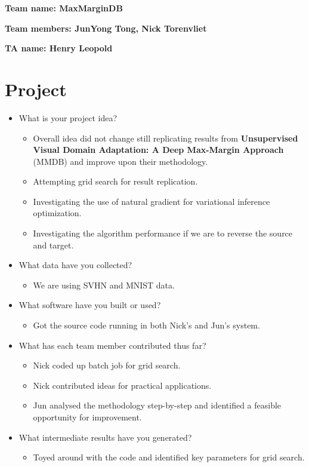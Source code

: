\textbf{Team name: MaxMarginDB}

\textbf{Team members: JunYong Tong, Nick Torenvliet}

\textbf{TA name: Henry Leopold}

\section*{Project}
\begin{itemize}
  \item What is your project idea?
  \begin{itemize}
      \item Overall idea did not change still replicating results from \textbf{Unsupervised Visual Domain Adaptation: A Deep Max-Margin Approach} (MMDB) and improve upon their methodology.
      \item Attempting grid search for result replication.
      \item Investigating the use of natural gradient for variational inference optimization.
      \item Investigating the algorithm performance if we are to reverse the source and target.
  \end{itemize}
  \item What data have you collected?
  \begin{itemize}
      \item We are using SVHN and MNIST data.
  \end{itemize}
  \item What software have you built or used?
  \begin{itemize}
      \item Got the source code running in both Nick's and Jun's system.
  \end{itemize}
  \item What has each team member contributed thus far?
  \begin{itemize}
      \item Nick coded up batch job for grid search.
      \item Nick contributed ideas for practical applications.
      \item Jun analysed the methodology step-by-step and identified a feasible opportunity for improvement.
  \end{itemize}
  \item What intermediate results have you generated?
  \begin{itemize}
      \item Toyed around with the code and identified key parameters for grid search.

\end{itemize}
\end{itemize}
